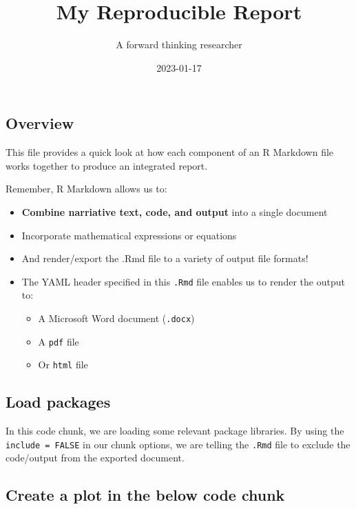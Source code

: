\documentclass[
]{article}
\title{My Reproducible Report}
\author{A forward thinking researcher}
\date{2023-01-17}
\providecommand{\tightlist}{%
  \setlength{\itemsep}{0pt}\setlength{\parskip}{0pt}}
\begin{document}
\maketitle

\hypertarget{overview}{%
\subsection{Overview}\label{overview}}

This file provides a quick look at how each component of an R Markdown
file works together to produce an integrated report.

Remember, R Markdown allows us to:

\begin{itemize}
\tightlist
\item
  \textbf{Combine narriative text, code, and output} into a single
  document
\item
  Incorporate mathematical expressions or equations
\item
  And render/export the .Rmd file to a variety of output file formats!
\item
  The YAML header specified in this \texttt{.Rmd} file enables us to
  render the output to:

  \begin{itemize}
  \tightlist
  \item
    A Microsoft Word document (\texttt{.docx})
  \item
    A \texttt{pdf} file
  \item
    Or \texttt{html} file
  \end{itemize}
\end{itemize}

\hypertarget{load-packages}{%
\subsection{Load packages}\label{load-packages}}

In this code chunk, we are loading some relevant package libraries. By
using the \texttt{include\ =\ FALSE} in our chunk options, we are
telling the \texttt{.Rmd} file to exclude the code/output from the
exported document.

\hypertarget{create-a-plot-in-the-below-code-chunk}{%
\subsection{Create a plot in the below code
chunk}\label{create-a-plot-in-the-below-code-chunk}}
\end{document}
